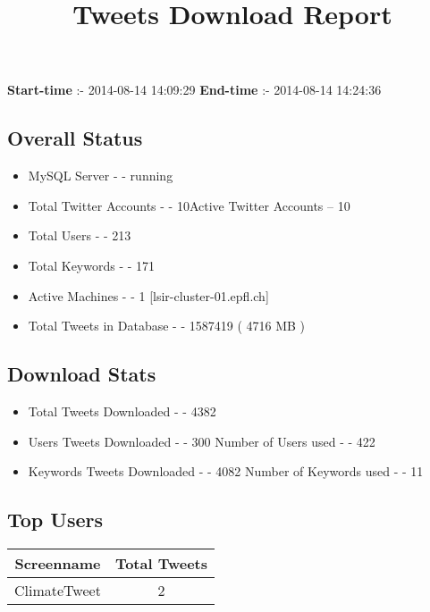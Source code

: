 \documentclass{article}\usepackage[T1]{fontenc}
\begin{document}
\title{\textbf{Tweets Download Report}}
               \date{}
                \maketitle
               \centerline{\textbf{Start-time} :- 2014-08-14 14:09:29 \hspace{40pt} \textbf{End-time} :- 2014-08-14 14:24:36}               \subsection*{Overall Status}                \begin{itemize}                \item MySQL Server - - running               \item Total Twitter Accounts - - 10\newline Active Twitter Accounts -- 10               \item Total Users - - 213               \item Total Keywords - - 171               \item Active Machines - - 1 [lsir-cluster-01.epfl.ch]               \item Total Tweets in Database - - 1587419 ( 4716 MB )               \end{itemize}               \subsection*{Download Stats}                \begin{itemize}                \item Total Tweets Downloaded - - 4382               \item Users Tweets Downloaded - - 300 \newline Number of Users used - - 422               \item Keywords Tweets Downloaded - - 4082 \newline Number of Keywords used - - 11              \end{itemize}              \subsection*{Top Users}\begin{tabular}{|c|c|}         \hline         Screenname & Total Tweets \\ 
 \hline
ClimateTweet & 2\\ 
 \hline

\end{tabular}
\end{document}
